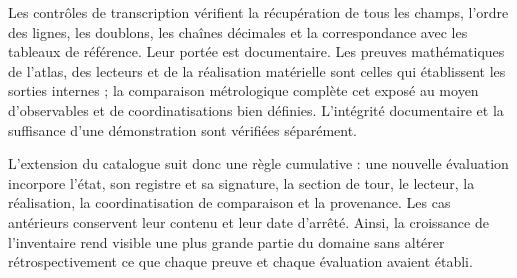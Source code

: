 Les contrôles de transcription vérifient la récupération de tous les
champs, l’ordre des lignes, les doublons, les chaînes décimales et la
correspondance avec les tableaux de référence. Leur portée est documentaire.
Les preuves mathématiques de l’atlas, des lecteurs et de la réalisation matérielle
sont celles qui établissent les sorties internes ; la comparaison métrologique
complète cet exposé au moyen d’observables et de coordinatisations bien définies.
L’intégrité documentaire et la suffisance d’une démonstration sont
vérifiées séparément.


L’extension du catalogue suit donc une règle cumulative :
une nouvelle évaluation incorpore l’état, son registre et sa signature, la section
de tour, le lecteur, la réalisation, la coordinatisation de comparaison et la
provenance. Les cas antérieurs conservent leur contenu et leur date
d’arrêté. Ainsi, la croissance de l’inventaire rend visible une plus grande partie
du domaine sans altérer rétrospectivement ce que chaque preuve et
chaque évaluation avaient établi.

